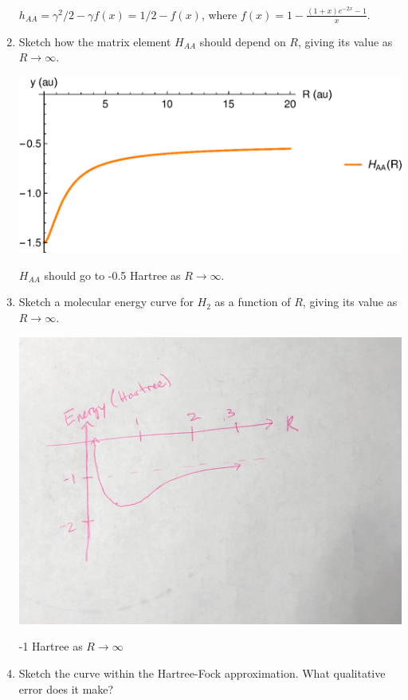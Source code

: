 \documentclass{article}
\begin{document}
\begin{enumerate}
  {\color{blue}
  $h_{AA} = \gamma^2/2 - \gamma f(x) = 1/2 - f(x)$,
  where $f(x) = 1-\frac{(1+x)e^{-2x}-1}{x}$}.
\item Sketch how the matrix element $H_{AA}$ should depend on $R$, giving its
  value as $R\to\infty$.
  \begin{center}
    \includegraphics[scale=0.5]{haa_quiz4.eps}
  \end{center}
  {\color{blue}$H_{AA}$ should go to -0.5 Hartree as $R \rightarrow \infty$.}
\item Sketch a molecular energy curve for $H_2$ as a function of $R$,
  giving its value as $R\to\infty$.
  \begin{center}
    \includegraphics[scale=0.06]{molecular_h2.jpg}
  \end{center}
  {\color{blue} -1 Hartree as $R\rightarrow \infty$}
\item Sketch the curve within the Hartree-Fock approximation.
  What qualitative error does it make?


\end{enumerate}
\end{document}
